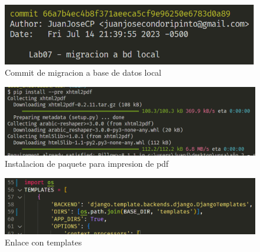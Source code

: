 \documentclass{article}
\begin{document}
        \begin{figure}
            \centering
            \includegraphics[width=150mm]{img/commit3.png}
            \caption{Commit de migracion a base de datos local}
            \label{fig:enter-label}
        \end{figure}
        \begin{figure}
            \centering
            \includegraphics[width=150mm]{img/img7.png}
            \caption{Instalacion de paquete para impresion de pdf}
            \label{fig:enter-label}
        \end{figure}
        \begin{figure}
            \centering
            \includegraphics[width=150mm]{img/img8.png}
            \caption{Enlace con templates}
            \label{fig:enter-label}
        \end{figure}
\end{document}
